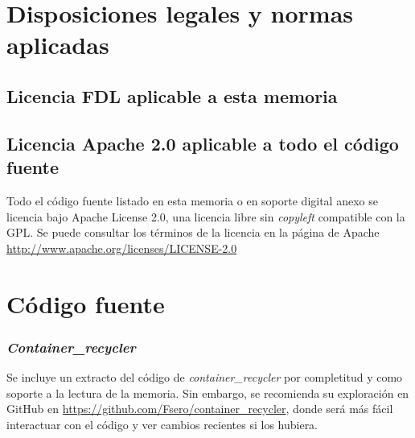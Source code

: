 
\appendix

\chapter{Disposiciones legales y normas aplicadas}
\section{Licencia FDL aplicable a esta memoria}

\section{Licencia Apache 2.0 aplicable a todo el código fuente}
Todo el código fuente listado en esta memoria o en soporte digital anexo se licencia bajo Apache License 2.0, una licencia libre sin \emph{copyleft} compatible con la GPL.
Se puede consultar los términos de la licencia en la página de Apache \url{http://www.apache.org/licenses/LICENSE-2.0}



\chapter{Código fuente}

\subsection{\emph{Container\_recycler}}
\label{subsec:containe-recycler-src-code}

Se incluye un extracto del código de \emph{container\_recycler} por completitud y como soporte a la lectura de la memoria. Sin
embargo, se recomienda su exploración en GitHub en \href{https://github.com/Fsero/container\_recycler}{https://github.com/Fsero/container\_recycler}, donde será más fácil interactuar con el código y ver cambios recientes si los 
hubiera.

